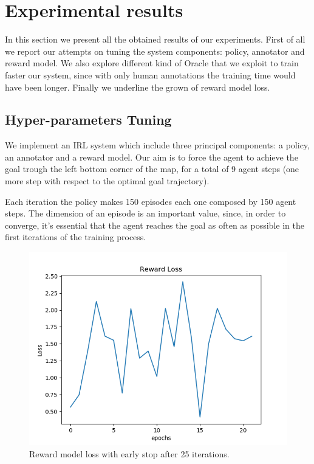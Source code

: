 \section{Experimental results}\label{05}
In this section we present all the obtained results of our experiments. First of all we report our attempts on tuning the system components: policy, annotator and reward model. We also explore different kind of Oracle that we exploit to train faster our system, since with only human annotations the training time would have been longer. Finally we underline the grown of reward model loss.




\subsection{Hyper-parameters Tuning}        %
We implement an IRL system which include three principal components: a policy, an annotator and a reward model. Our aim is to force the agent to achieve the goal trough the left bottom corner of the map, for a total of 9 agent steps (one more step with respect to the optimal goal trajectory).

Each iteration the policy makes 150 episodes each one composed by 150 agent steps. The dimension of an episode is an important value, since, in order to converge, it's essential that the agent reaches the goal as often as possible in the first iterations of the training process. 


\begin{figure}[t]
    \centering
    \includegraphics[width=\linewidth]{data/reward_loss.png} 
    \caption{Reward model loss with early stop after 25 iterations.}
	\label{fig:rewardloss}%
\end{figure}

